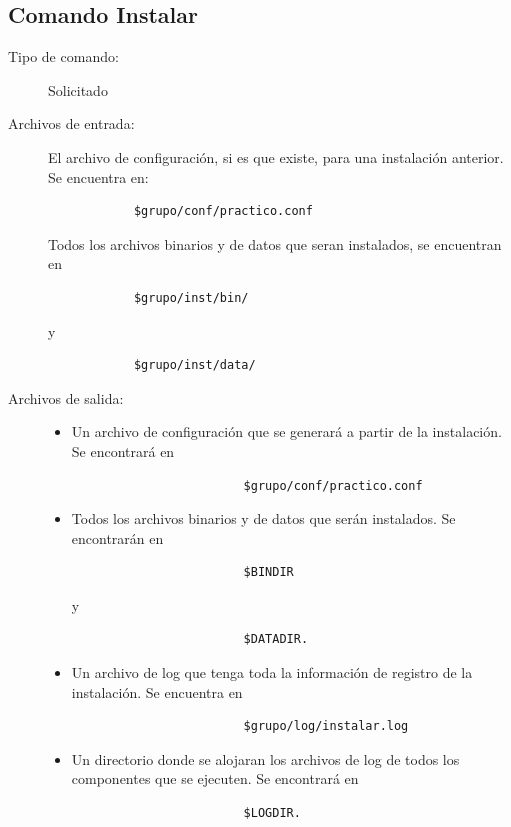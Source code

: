 \documentclass[12pt]{article}
\begin{document}
\subsection{Comando Instalar}
\begin{description}
	\item [Tipo de comando:] Solicitado
	
	\item [Archivos de entrada:] 
		El archivo de configuración, si es que existe, para una instalación anterior. Se encuentra en:
		\begin{verbatim}
			$grupo/conf/practico.conf
		\end{verbatim}
		Todos los archivos binarios y de datos que seran instalados, se encuentran en 
		\begin{verbatim}
			$grupo/inst/bin/ 
		\end{verbatim}	
		y 
		\begin{verbatim}	
			$grupo/inst/data/
		\end{verbatim}
	
	
	\item [Archivos de salida:] 
		\begin{itemize}
			\item	Un archivo de configuración que se generará a partir de la instalación. Se encontrará en  
					\begin{verbatim}	
						$grupo/conf/practico.conf
					\end{verbatim}	
			\item Todos los archivos binarios y de datos que serán instalados. Se encontrarán en 
					\begin{verbatim}	
						$BINDIR 
					\end{verbatim}
					y 
					\begin{verbatim}	
						$DATADIR.
					\end{verbatim}
					
			\item	Un archivo de log que tenga toda la información de registro de la instalación. Se encuentra en 
					\begin{verbatim}
						$grupo/log/instalar.log
					\end{verbatim}
					
			\item	Un directorio donde se alojaran los archivos de log de todos los componentes que se ejecuten. Se encontrará en 
					\begin{verbatim}
						$LOGDIR.
					\end{verbatim}
		\end{itemize}
	

\end{description}
\end{document}
